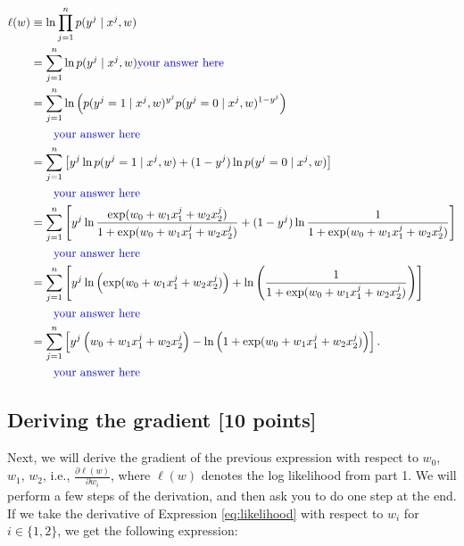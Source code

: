 \documentclass[a4paper]{article}
\theoremstyle{definition}
\begin{document}
	\begin{align}
		\ell(w)&\equiv\ln\prod_{j=1}^n p(y^j\mid x^j,w)\\
		&=\sum_{j=1}^n \ln p(y^j\mid x^j,w) {\color{blue} \text{your answer here}}\\ \label{eq:prob-y}
		&=\sum_{j=1}^n \ln \left(p(y^j=1\mid x^j,w)^{y^j}p(y^j=0\mid x^j,w)^{1-y^j}\right)\\ \label{eq:prob-power}
		&\quad\quad {\color{blue}\text{your answer here}}\nonumber \\ 
		&=\sum_{j=1}^n \left[y^j\ln p(y^j=1\mid x^j,w)+(1-y^j)\ln p(y^j=0\mid x^j,w)\right]\\
		&\quad\quad {\color{blue}\text{your answer here}}\nonumber \\
		&=\sum_{j=1}^n \left[y^j\ln \frac{\exp(w_0 + w_1 x_1^j + w_2 x_2^j)}{1+\exp(w_0 + w_1 x_1^j + w_2 x_2^j)}
		+(1-y^j) \ln\frac{1}{1+\exp(w_0 + w_1 x_1^j + w_2 x_2^j)}\right] \\ \label{eq:last}
		&\quad\quad{\color{blue} \text{your answer here}}\nonumber \\
		&=\sum_{j=1}^n \left[y^j \ln\left( \exp(w_0 + w_1 x_1^j + w_2 x_2^j)\right)
		+\ln\left(\frac{1}{1+\exp(w_0 + w_1 x_1^j + w_2 x_2^j)}\right)\right] \\
		&\quad\quad{\color{blue}\text{your answer here}}\nonumber \\
		&=\sum_{j=1}^n\left[y^j\left( w_0+w_1 x_1^j+w_2 x_2^j\right)
		-\ln\left( 1+\exp(w_0 + w_1 x_1^j + w_2 x_2^j)\right)\right]. \label{eq:likelihood}\\
		&\quad\quad{\color{blue}\text{your answer here}}\nonumber    
	\end{align}
	
	
\subsection{Deriving the gradient [10 points]}

	Next, we will derive the gradient of the previous expression with respect to
	$w_0$, $w_1$, $w_2$, i.e., $\frac{\partial \ell(w)}{\partial w_i}$, where $\ell(w)$ denotes the log likelihood from part 1. 
	We will perform a few steps of the derivation, and then ask you to do one step at the end.
	If we take the derivative of Expression \ref{eq:likelihood} with respect to
	$w_i$ for $i\in \{1,2\}$, we get the following expression:
	
\end{document}
